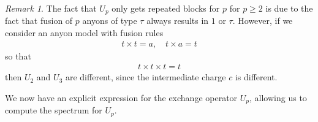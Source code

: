 \documentclass[a4paper,10pt,oneside]{book}
\theoremstyle{plain}
\theoremstyle{definition}
\theoremstyle{remark}
\newtheorem{remark}{Remark}[section]
\begin{document}
\begin{remark}
  The fact that $U_p$ only gets repeated blocks for $p$ for $p \ge 2$ is due to the fact that fusion of $p$ anyons of type $τ$ always results in $1$ or $τ$. However, if we consider an anyon model with fusion rules
  \begin{align*}
    t \times t = a, \quad
    t \times a = t
  \end{align*}
  so that
  \begin{align*}
    t \times t \times t = t
  \end{align*}
  then $U_2$ and $U_3$ are different, since the intermediate charge $c$ is different.
\end{remark}

We now have an explicit expression for the exchange operator $U_p$, allowing us to compute the spectrum for $U_p$.
\end{document}
